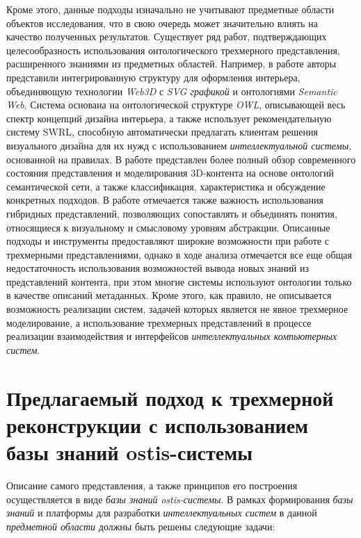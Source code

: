 Кроме этого, данные подходы изначально не учитывают предметные области объектов исследования, что в свою очередь может значительно влиять на качество полученных результатов. Существует ряд работ, подтверждающих целесообразность использования онтологического трехмерного представления, расширенного знаниями из предметных областей. Например, в работе  авторы представили интегрированную структуру для оформления интерьера, объединяющую технологии \textit{Web3D} с \textit{SVG графикой} и онтологиями \textit{Semantic Web}. Система основана на онтологической структуре \textit{OWL}, описывающей весь спектр концепций дизайна интерьера, а также использует рекомендательную систему SWRL, способную автоматически предлагать клиентам решения визуального дизайна для их нужд с использованием \textit{интеллектуальной системы}, основанной на правилах. В работе  представлен более полный обзор современного состояния представления и моделирования 3D-контента на основе онтологий семантической сети, а также классификация, характеристика и обсуждение конкретных подходов. В работе отмечается также важность использования гибридных представлений, позволяющих сопоставлять и объединять понятия, относящиеся к визуальному и смысловому уровням абстракции. Описанные подходы и инструменты предоставляют широкие возможности при работе с трехмерными представлениями, однако в ходе анализа отмечается все еще общая недостаточность использования возможностей вывода новых знаний из представлений контента, при этом многие системы используют онтологии только в качестве описаний метаданных. Кроме этого, как правило, не описывается возможность реализации систем, задачей которых является не явное трехмерное моделирование, а использование трехмерных представлений в процессе реализации взаимодействия и интерфейсов \textit{интеллектуальных компьютерных систем}.

\section{Предлагаемый подход к трехмерной реконструкции с использованием базы знаний ostis-системы}
\label{sec_3d_models_approach}

Описание самого представления, а также принципов его построения осуществляется в виде \textit{базы знаний} \textit{ostis-системы}. В рамках формирования \textit{базы знаний} и платформы для разработки \textit{интеллектуальных систем} в данной \textit{предметной области} должны быть решены следующие задачи:

